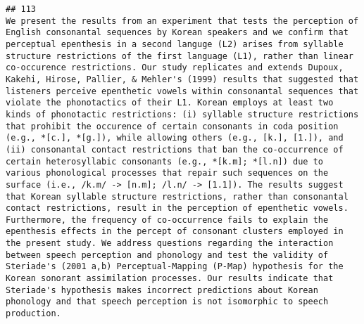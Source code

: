 \documentclass[
  english,
  man]{apa6}
\begin{document}
\begin{verbatim}
## 113                                                                                                                                                                                                                                                                                                                                                                                                                                                                                                                                                                                                                                                                                                                                                                                                                                                                                                     We present the results from an experiment that tests the perception of English consonantal sequences by Korean speakers and we confirm that perceptual epenthesis in a second languge (L2) arises from syllable structure restrictions of the first language (L1), rather than linear co-occurence restrictions. Our study replicates and extends Dupoux, Kakehi, Hirose, Pallier, & Mehler's (1999) results that suggested that listeners perceive epenthetic vowels within consonantal sequences that violate the phonotactics of their L1. Korean employs at least two kinds of phonotactic restrictions: (i) syllable structure restrictions that prohibit the occurence of certain consonants in coda position (e.g., *[c.], *[g.]), while allowing others (e.g., [k.], [1.]), and (ii) consonantal contact restrictions that ban the co-occurrence of certain heterosyllabic consonants (e.g., *[k.m]; *[l.n]) due to various phonological processes that repair such sequences on the surface (i.e., /k.m/ -> [n.m]; /l.n/ -> [1.1]). The results suggest that Korean syllable structure restrictions, rather than consonantal contact restrictions, result in the perception of epenthetic vowels. Furthermore, the frequency of co-occurrence fails to explain the epenthesis effects in the percept of consonant clusters employed in the present study. We address questions regarding the interaction between speech perception and phonology and test the validity of Steriade's (2001 a,b) Perceptual-Mapping (P-Map) hypothesis for the Korean sonorant assimilation processes. Our results indicate that Steriade's hypothesis makes incorrect predictions about Korean phonology and that speech perception is not isomorphic to speech production.

\end{verbatim}
\end{document}
